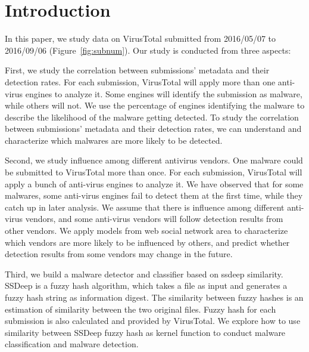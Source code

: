 \section{Introduction}
\label{sec:intro}

In this paper, we study data on VirusTotal submitted from 2016/05/07 to 2016/09/06 (Figure~\ref{fig:subnum}). 
Our study is conducted from three aspects:



First, we study the correlation between submissions' metadata and their detection rates. 
For each submission, VirusTotal will apply more than one anti-virus engines to analyze it. 
Some engines will identify the submission as malware, while others will not. 
We use the percentage of engines identifying the malware to describe the likelihood of the malware getting detected. 
To study the correlation between submissions' metadata and their detection rates, 
we can understand and characterize which malwares are more likely to be detected.   

Second, we study influence among different antivirus vendors. 
One malware could be submitted to VirusTotal more than once. 
For each submission, VirusTotal will apply a bunch of anti-virus engines to analyze it.
We have observed that for some malwares, some anti-virus engines fail to detect them at the first time, while they catch up in later analysis. 
We assume that there is influence among different anti-virus vendors, 
and some anti-virus vendors will follow detection results from other vendors. 
We apply models from web social network area to characterize 
which vendors are more likely to be influenced by others, 
and predict whether detection results from some vendors may change in the future.  

Third, we build a malware detector and classifier based on ssdeep similarity. 
SSDeep is a fuzzy hash algorithm, which takes a file as input and generates a fuzzy hash string as information digest. 
The similarity between fuzzy hashes is an estimation of similarity between the two original files. 
Fuzzy hash for each submission is also calculated and provided by VirusTotal. 
We explore how to use similarity between SSDeep fuzzy hash as 
kernel function to conduct malware classification and malware detection. 